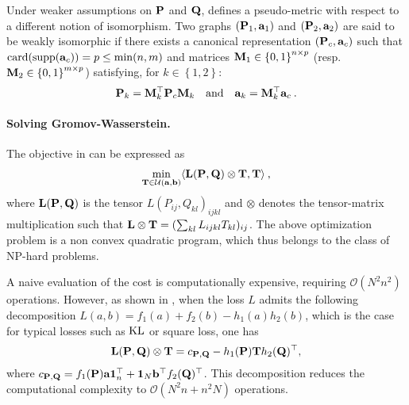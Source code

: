 \begin{remark}
    Under weaker assumptions on ${\mathbf{P}}$ and ${\mathbf{Q}}$,  defines a pseudo-metric with respect to a different notion of isomorphism. Two graphs $({\mathbf{P}}_1, {\mathbf{a}}_1)$ and $({\mathbf{P}}_2, {\mathbf{a}}_2)$ are said to be weakly isomorphic \citep{chowdhury2019gromov} if there exists a canonical representation $({\mathbf{P}}_c, {\mathbf{a}}_c)$ such that $\operatorname{card}(\operatorname{supp}({\mathbf{a}}_c)) = p \leq \min(n, m)$ and matrices ${\mathbf{M}}_1 \in \left\{0,1 \right\}^{n \times p}$ (resp. ${\mathbf{M}}_2 \in \left\{0,1 \right\}^{m \times p}$) satisfying, for $k \in \left\{1, 2\right\}$:
    \begin{equation}
        {\mathbf{P}}_k = {\mathbf{M}}_k^\top {\mathbf{P}}_c {\mathbf{M}}_k \quad \text{and} \quad {\mathbf{a}}_k = {\mathbf{M}}_k^\top {\mathbf{a}}_c \:.
    \end{equation}
\end{remark}


\paragraph{Solving Gromov-Wasserstein.} The objective in  can be expressed as 
\begin{align}
    \min_{{\mathbf{T}} \in {\mathcal{U}}({\mathbf{a}}, {\mathbf{b}})} \langle {\mathbf{L}}({\mathbf{P}}, {\mathbf{Q}}) \otimes {\mathbf{T}}, {\mathbf{T}} \rangle \:,
\end{align}
where ${\mathbf{L}}({\mathbf{P}}, {\mathbf{Q}})$ is the tensor $L(P_{ij}, Q_{kl})_{ijkl}$ and $\otimes$ denotes the tensor-matrix multiplication such that ${\mathbf{L}} \otimes {\mathbf{T}} = (\sum_{kl} L_{ijkl} T_{kl})_{ij}$. The above optimization problem is a non convex quadratic program, which thus belongs to the class of NP-hard problems. 

A naive evaluation of the cost is computationally expensive, requiring $\mathcal{O}(N^2n^2)$ operations. However, as shown in \citep{peyre2016gromov}, when the loss $L$ admits the following decomposition $L(a, b) = f_{1}(a) + f_{2}(b) - h_{1}(a) h_{2}(b)$, which is the case for typical losses such as $\operatorname{KL}$ or square loss, one has
\[
{\mathbf{L}}({\mathbf{P}}, {\mathbf{Q}}) \otimes {\mathbf{T}} = c_{{\mathbf{P}}, {\mathbf{Q}}} - h_1({\mathbf{P}}) {\mathbf{T}} h_2({\mathbf{Q}})^\top,
\]
where $c_{{\mathbf{P}}, {\mathbf{Q}}} = f_1({\mathbf{P}}) {\mathbf{a}} \mathbf{1}_n^\top + \mathbf{1}_N {\mathbf{b}}^\top f_2({\mathbf{Q}})^\top$. This decomposition reduces the computational complexity to $\mathcal{O}(N^2n + n^2N)$ operations.

